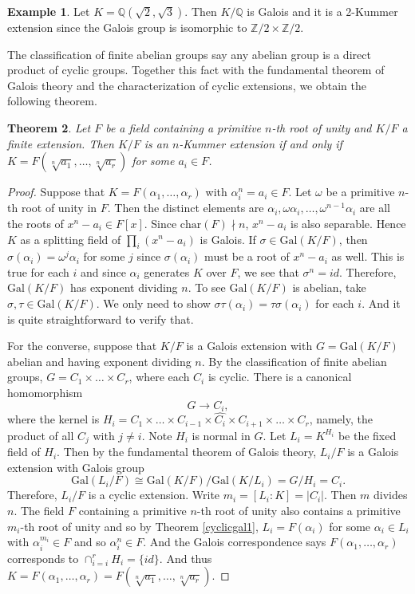 \documentclass[12pt]{report}
\newtheorem{theorem}{Theorem}[section]
\theoremstyle{definition}
\newtheorem{example}[theorem]{Example}
\newcommand{\gal}{\text{Gal}}
\newcommand{\zz}{\mathbb{Z}}
\newcommand{\qq}{\mathbb{Q}}
\newcommand{\sqrtn}[1]{\sqrt[n]{#1}}
\newcommand{\charr}{\text{char}}
\begin{document}
\begin{example}
	Let $K=\qq(\sqrt{2},\sqrt{3})$. Then $K/\qq$ is Galois and it is a 2-Kummer extension since the Galois group is isomorphic to $\zz/2\times \zz/2$.
\end{example}

The classification of finite abelian groups say any abelian group is a direct product of cyclic groups. Together this fact with the fundamental theorem of Galois theory and the characterization of cyclic extensions, we obtain the following theorem.

\begin{theorem}\label{kummer2}
	Let $F$ be a field containing a primitive $n$-th root of unity and $K/F$ a finite extension. Then $K/F$ is an $n$-Kummer extension if and only if $K=F(\sqrtn{a_1},\dots,\sqrtn{a_r})$ for some $a_i\in F$.
\end{theorem}

\begin{proof}
	Suppose that $K=F(\alpha_1,\dots,\alpha_r)$ with $\alpha_i^n=a_i\in F$. Let $\omega$ be a primitive $n$-th root of unity in $F$. Then the distinct elements are $\alpha_i,\omega\alpha_i,\dots,\omega^{n-1}\alpha_i$ are all the roots of $x^n-a_i\in F[x]$. Since $\charr(F)\nmid n$, $x^n-a_i$ is also separable. Hence $K$ as a splitting field of $\prod_i(x^n-a_i)$ is Galois. If $\sigma\in\gal(K/F)$, then $\sigma(\alpha_i)=\omega^j\alpha_i$ for some $j$ since $\sigma(\alpha_i)$ must be a root of $x^n-a_i$ as well. This is true for each $i$ and since $\alpha_i$ generates $K$ over $F$, we see that $\sigma^n=id$. Therefore, $\gal(K/F)$ has exponent dividing $n$. To see $\gal(K/F)$ is abelian, take $\sigma,\tau\in \gal(K/F)$. We only need to show $\sigma\tau(\alpha_i)=\tau\sigma(\alpha_i)$ for each $i$. And it is quite straightforward to verify that.


	For the converse, suppose that $K/F$ is a Galois extension with $G=\gal(K/F)$ abelian and having exponent dividing $n$. By the classification of finite abelian groups, $G=C_1\times\dots\times C_r$, where each $C_i$ is cyclic. There is a canonical homomorphism $$G\to C_i,$$ where the kernel is $H_i= C_1\times\dots \times C_{i-1} \times \hat{C_i}\times C_{i+1} \times\dots\times C_r$, namely, the product of all $C_j$ with $j\not=i$. Note $H_i$ is normal in $G$. Let $L_i=K^{H_i}$ be the fixed field of $H_i$. Then by the fundamental theorem of Galois theory, $L_i/F$ is a Galois extension with Galois group $$\gal(L_i/F)\cong \gal(K/F)/\gal(K/L_i)=G/H_i=C_i.$$ Therefore, $L_i/F$ is a cyclic extension. Write $m_i=[L_i:K]=|C_i|$. Then $m$ divides $n$. The field $F$ containing a primitive $n$-th root of unity also contains a primitive $m_i$-th root of unity and so by Theorem \ref{cyclicgal1}, $L_i=F(\alpha_i)$ for some $\alpha_i\in L_i$ with $\alpha_i^{m_i}\in F$ and so $\alpha_i^n\in F$. And the Galois correspondence says $F(\alpha_1,\dots,\alpha_r)$ corresponds to $\cap_{i=i}^r H_i=\{id\}$. And thus $K=F(\alpha_1,\dots,\alpha_r)=F(\sqrtn{a_1},\dots,\sqrtn{a_r})$.
\end{proof}
\end{document}
